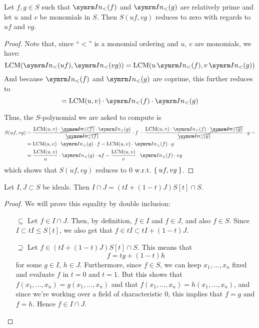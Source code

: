 \begin{problem}
Let \(f, g \in S\) such that \(\In(f)\) and \(\In(g)\) are relatively prime and let \(u\) and \(v\) be monomials in \(S\). Then \(S(uf, vg)\) reduces to zero with regards to \(uf\) and \(vg\).
\end{problem}
\begin{proof}
Note that, since ``\(<\)'' is a monomial ordering and \(u\), \(v\) are monomials, we have:
\[
    \LCM(\In(uf), \In(vg)) = \LCM(u \In(f), v \In(g))
\]
And because \(\In(f)\) and \(\In(g)\) are coprime, this further reduces to
\[
    = \LCM(u, v) \cdot \In(f) \cdot \In(g)
\]

Thus, the \(S\)-polynomial we are asked to compute is
\begin{align*}
    S(uf, vg) &= \frac{\LCM(u, v) \cdot \cancel{\In(f)} \cdot \In(g)}{\cancel{\In(f)}} \cdot f - \frac{\LCM(u, v) \cdot \In(f) \cdot \cancel{\In(g)}}{\cancel{\In(g)}} \cdot g = \\
    &= \LCM(u, v) \cdot \In(g) \cdot f - \LCM(u, v) \cdot \In(f) \cdot g \\
    &= \frac{\LCM(u, v)}{u} \cdot \In(g) \cdot uf - \frac{\LCM(u, v)}{v} \cdot \In(f) \cdot vg
\end{align*}
which shows that \(S(uf, vg)\) reduces to 0 w.r.t. \(\Set{ uf, vg }\).
\end{proof}

\begin{problem}
Let \(I, J \subset S\) be ideals. Then \(I \cap J = (tI + (1 - t)J) S[t] \cap S\).
\end{problem}
\begin{proof}
We will prove this equality by double inclusion:
\begin{itemize}
    \item[\(\subseteq\)] Let \(f \in I \cap J\). Then, by definition, \(f \in I\) and \(f \in J\), and also \(f \in S\). Since \(I \subset tI \leq S[t]\), we also get that \(f \in tI \subset tI + (1 - t)J\).
    
    \item[\(\supseteq\)] Let \(f \in (tI + (1 - t)J) S[t] \cap S\). This means that
    \[
        f = t g + (1 - t) h
    \]
    for some \(g \in I\), \(h \in J\). Furthermore, since \(f \in S\), we can keep \(x_1, \dots, x_n\) fixed and evaluate \(f\) in \(t = 0\) and \(t = 1\). But this shows that \(f(x_1, \dots, x_n) = g(x_1, \dots, x_n)\) and that \(f(x_1, \dots, x_n) = h(x_1, \dots, x_n)\), and since we're working over a field of characteristic 0, this implies that \(f = g\) and \(f = h\). Hence \(f \in I \cap J\).
\end{itemize}
\end{proof}

